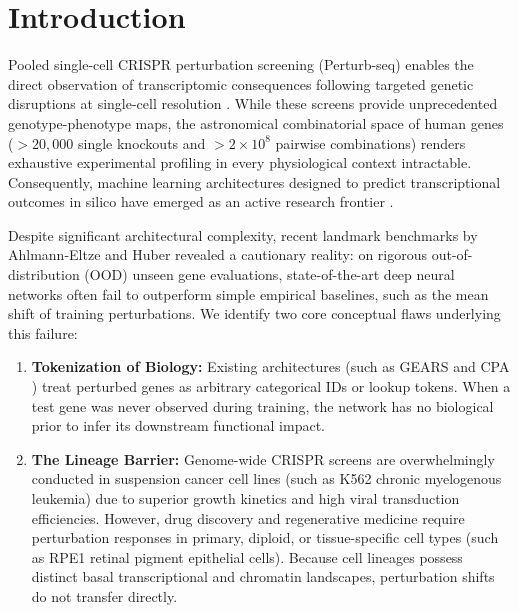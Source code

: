 \documentclass[11pt,letterpaper]{article}
\begin{document}
\vspace{1.5em}

\section{Introduction}
Pooled single-cell CRISPR perturbation screening (Perturb-seq) enables the direct observation of transcriptomic consequences following targeted genetic disruptions at single-cell resolution \cite{dixit2016perturb, adamson2016multiplexed, norman2019exploring, replogle2022mapping}. While these screens provide unprecedented genotype-phenotype maps, the astronomical combinatorial space of human genes ($>20,000$ single knockouts and $>2 \times 10^8$ pairwise combinations) renders exhaustive experimental profiling in every physiological context intractable. Consequently, machine learning architectures designed to predict transcriptional outcomes in silico have emerged as an active research frontier \cite{roohani2023predicting, lotfollahi2019scgen, lotfollahi2023biologically}.

Despite significant architectural complexity, recent landmark benchmarks by Ahlmann-Eltze and Huber \cite{ahlmann2025benchmarking} revealed a cautionary reality: on rigorous out-of-distribution (OOD) unseen gene evaluations, state-of-the-art deep neural networks often fail to outperform simple empirical baselines, such as the mean shift of training perturbations. We identify two core conceptual flaws underlying this failure:
\begin{enumerate}
    \item \textbf{Tokenization of Biology:} Existing architectures (such as GEARS \cite{roohani2023predicting} and CPA \cite{lotfollahi2023biologically}) treat perturbed genes as arbitrary categorical IDs or lookup tokens. When a test gene was never observed during training, the network has no biological prior to infer its downstream functional impact.
    \item \textbf{The Lineage Barrier:} Genome-wide CRISPR screens are overwhelmingly conducted in suspension cancer cell lines (such as K562 chronic myelogenous leukemia) due to superior growth kinetics and high viral transduction efficiencies. However, drug discovery and regenerative medicine require perturbation responses in primary, diploid, or tissue-specific cell types (such as RPE1 retinal pigment epithelial cells). Because cell lineages possess distinct basal transcriptional and chromatin landscapes, perturbation shifts do not transfer directly.
\end{enumerate}
\end{document}
